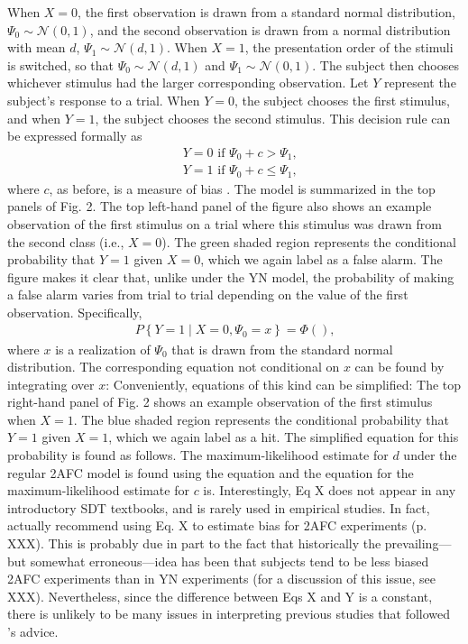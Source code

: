 \documentclass[man]{apa6}
\begin{document}
When $X=0$, the first observation is drawn from a standard normal distribution, $\Psi_{0}\sim{}\mathcal{N}\left(0,1\right)$, and the second observation is drawn from a normal distribution with mean $d$, $\Psi_{1}\sim{}\mathcal{N}\left(d,1\right)$.
When $X=1$, the presentation order of the stimuli is switched, so that $\Psi_{0}\sim{}\mathcal{N}\left(d,1\right)$ and $\Psi_{1}\sim{}\mathcal{N}\left(0,1\right)$. The subject then chooses whichever stimulus had the larger corresponding observation. Let $Y$ represent the subject's response to a trial. When $Y=0$, the subject chooses the first stimulus, and when $Y=1$, the subject chooses the second stimulus. This decision rule can be expressed formally as
\begin{eqnarray*}
&Y=0\textrm{ if }\Psi_0+c>\Psi_1\textrm{,}\\
&Y=1\textrm{ if }\Psi_0+c\le\Psi_1\textrm{,}
\end{eqnarray*}where $c$, as before, is a measure of bias \parencite[see][]{decarloon2012}. The model is summarized in the top panels of Fig. 2. The top left-hand panel of the figure also shows an example observation of the first stimulus on a trial where this stimulus was drawn from the second class (i.e., $X=0$). The green shaded region represents the conditional probability that $Y=1$ given $X=0$, which we again label as a false alarm. The figure makes it clear that, unlike under the YN model, the probability of making a false alarm varies from trial to trial depending on the value of the first observation. Specifically,
\begin{eqnarray*}
P\left\{Y=1\mid{}X=0, \Psi_0=x\right\}=\Phi\left(  \right)\textrm{,}
\end{eqnarray*}where $x$ is a realization of $\Psi_0$ that is drawn from the standard normal distribution. The corresponding equation not conditional on $x$ can be found by integrating over $x$:
Conveniently, equations of this kind can be simplified:
The top right-hand panel of Fig. 2 shows an example observation of the first stimulus when $X=1$. The blue shaded region represents the conditional probability that $Y=1$ given $X=1$, which we again label as a hit. The simplified equation for this probability is found as follows.
The maximum-likelihood estimate for $d$ under the regular 2AFC model is found using the equation
and the equation for the maximum-likelihood estimate for $c$ is.
Interestingly, Eq X does not appear in any introductory SDT textbooks, and is rarely used in empirical studies. In fact,\parencite{Macmillan2005} actually recommend using Eq. X to estimate bias for 2AFC experiments (p. XXX). This is probably due in part to the fact that historically the prevailing---but somewhat erroneous---idea has been that subjects tend to be less biased 2AFC experiments than in YN experiments (for a discussion of this issue, see XXX). Nevertheless, since the difference between Eqs X and Y is a constant, there is unlikely to be many issues in interpreting previous studies that followed \parencite{Macmillan2005}'s advice.
\end{document}
